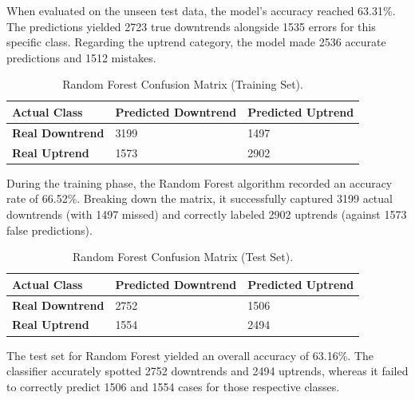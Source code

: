 \documentclass{ieeeaccess}
\begin{document}
When evaluated on the unseen test data, the model's accuracy reached 63.31\%. The predictions yielded 2723 true downtrends alongside 1535 errors for this specific class. Regarding the uptrend category, the model made 2536 accurate predictions and 1512 mistakes.


\begin{table}[!ht]
\caption{Random Forest Confusion Matrix (Training Set).}
\label{tab:rf_confusion_training}
\setlength{\tabcolsep}{3pt}
\begin{tabular}{|p{75pt}|p{70pt}|p{70pt}|}
\hline
\textbf{Actual Class} & \textbf{Predicted Downtrend} & \textbf{Predicted Uptrend} \\ 
\hline
\textbf{Real Downtrend} & 3199 & 1497 \\
\textbf{Real Uptrend} & 1573 & 2902 \\ 
\hline
\end{tabular}
\end{table}

During the training phase, the Random Forest algorithm recorded an accuracy rate of 66.52\%. Breaking down the matrix, it successfully captured 3199 actual downtrends (with 1497 missed) and correctly labeled 2902 uptrends (against 1573 false predictions).

\begin{table}[!ht]
\caption{Random Forest Confusion Matrix (Test Set).}
\label{tab:rf_confusion_test}
\setlength{\tabcolsep}{3pt}
\begin{tabular}{|p{75pt}|p{70pt}|p{70pt}|}
\hline
\textbf{Actual Class} & \textbf{Predicted Downtrend} & \textbf{Predicted Uptrend} \\ 
\hline
\textbf{Real Downtrend} & 2752 & 1506 \\
\textbf{Real Uptrend} & 1554 & 2494 \\ 
\hline
\end{tabular}
\end{table}

The test set for Random Forest yielded an overall accuracy of 63.16\%. The classifier accurately spotted 2752 downtrends and 2494 uptrends, whereas it failed to correctly predict 1506 and 1554 cases for those respective classes.
\end{document}
